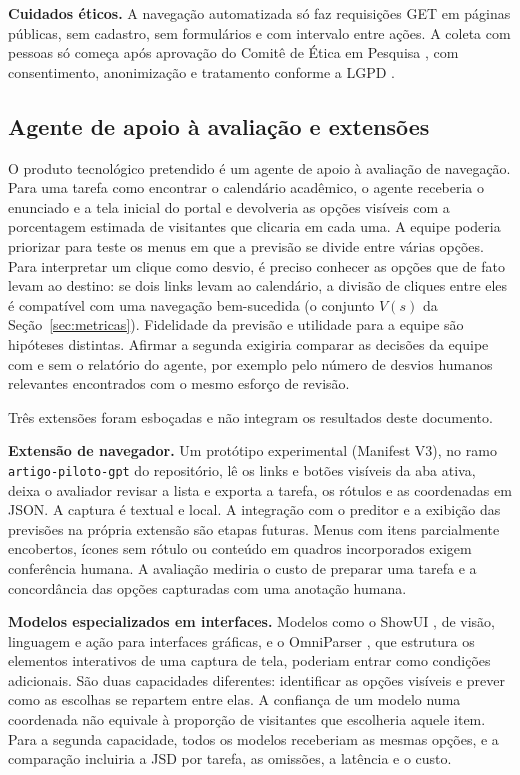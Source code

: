 \documentclass[12pt,oneside,a4paper,chapter=TITLE,english,brazil]{abntex2}
\newcommand{\code}[1]{\texttt{#1}}
\begin{document}
\textbf{Cuidados éticos.} A navegação automatizada só faz requisições GET em páginas públicas, sem cadastro, sem formulários e com intervalo entre ações. A coleta com pessoas só começa após aprovação do Comitê de Ética em Pesquisa \cite{cns2016res510}, com consentimento, anonimização e tratamento conforme a LGPD \cite{brasil2018lgpd}.

\subsection{Agente de apoio à avaliação e extensões}
\label{sec:extensoes}

\begin{planejado}
O produto tecnológico pretendido é um agente de apoio à avaliação de navegação. Para uma tarefa como encontrar o calendário acadêmico, o agente receberia o enunciado e a tela inicial do portal e devolveria as opções visíveis com a porcentagem estimada de visitantes que clicaria em cada uma. A equipe poderia priorizar para teste os menus em que a previsão se divide entre várias opções. Para interpretar um clique como desvio, é preciso conhecer as opções que de fato levam ao destino: se dois links levam ao calendário, a divisão de cliques entre eles é compatível com uma navegação bem-sucedida (o conjunto $V(s)$ da Seção~\ref{sec:metricas}). Fidelidade da previsão e utilidade para a equipe são hipóteses distintas. Afirmar a segunda exigiria comparar as decisões da equipe com e sem o relatório do agente, por exemplo pelo número de desvios humanos relevantes encontrados com o mesmo esforço de revisão.

Três extensões foram esboçadas e não integram os resultados deste documento.

\textbf{Extensão de navegador.} Um protótipo experimental (Manifest V3), no ramo \code{artigo-piloto-gpt} do repositório, lê os links e botões visíveis da aba ativa, deixa o avaliador revisar a lista e exporta a tarefa, os rótulos e as coordenadas em JSON. A captura é textual e local. A integração com o preditor e a exibição das previsões na própria extensão são etapas futuras. Menus com itens parcialmente encobertos, ícones sem rótulo ou conteúdo em quadros incorporados exigem conferência humana. A avaliação mediria o custo de preparar uma tarefa e a concordância das opções capturadas com uma anotação humana.

\textbf{Modelos especializados em interfaces.} Modelos como o ShowUI \cite{lin2024showui}, de visão, linguagem e ação para interfaces gráficas, e o OmniParser \cite{lu2024omniparser}, que estrutura os elementos interativos de uma captura de tela, poderiam entrar como condições adicionais. São duas capacidades diferentes: identificar as opções visíveis e prever como as escolhas se repartem entre elas. A confiança de um modelo numa coordenada não equivale à proporção de visitantes que escolheria aquele item. Para a segunda capacidade, todos os modelos receberiam as mesmas opções, e a comparação incluiria a JSD por tarefa, as omissões, a latência e o custo.


\end{planejado}
\end{document}
